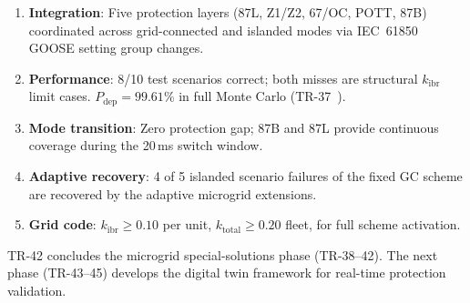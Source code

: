 \documentclass[11pt,a4paper]{article}
\begin{document}
\begin{enumerate}
  \item \textbf{Integration}: Five protection layers (87L, Z1/Z2, 67/OC, POTT,
    87B) coordinated across grid-connected and islanded modes via IEC~61850
    GOOSE setting group changes.

  \item \textbf{Performance}: 8/10 test scenarios correct; both misses are
    structural $k_\mathrm{ibr}$ limit cases.  $P_\mathrm{dep}=99.61\%$ in
    full Monte Carlo (TR-37~\cite{SAMBP_TR37}).

  \item \textbf{Mode transition}: Zero protection gap; 87B and 87L provide
    continuous coverage during the 20\,ms switch window.

  \item \textbf{Adaptive recovery}: 4 of 5 islanded scenario failures of the
    fixed GC scheme are recovered by the adaptive microgrid extensions.

  \item \textbf{Grid code}: $k_\mathrm{ibr}\geq0.10$ per unit,
    $k_\mathrm{total}\geq0.20$ fleet, for full scheme activation.
\end{enumerate}

\noindent
TR-42 concludes the microgrid special-solutions phase (TR-38--42).  The next
phase (TR-43--45) develops the digital twin framework for real-time protection
validation.



\end{document}

